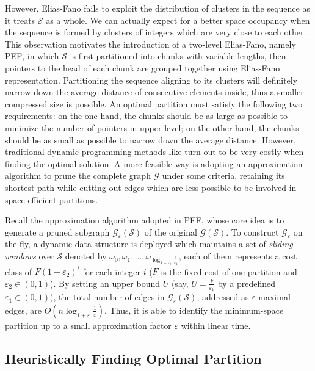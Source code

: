 \documentclass[runningheads,a4paper]{llncs}
\begin{document}
However, Elias-Fano fails to exploit the distribution of clusters in the sequence as it treats $ \mathcal{S} $ as a whole.
We can actually expect for a better space occupancy when the sequence is formed by clusters of integers which are very close to each other.
This observation motivates the introduction of a two-level Elias-Fano, namely PEF, in which $ \mathcal{S} $ is first partitioned into chunks with variable lengths, then pointers to the head of each chunk are grouped together using Elias-Fano representation.
Partitioning the sequence aligning to its clusters will definitely narrow down the average distance of consecutive elements inside, thus a smaller compressed size is possible.
An optimal partition must satisfy the following two requirements: on the one hand, the chunks should be as large as possible to minimize the number of pointers in upper level; on the other hand, the chunks should be as small as possible to narrow down the average distance.
However, traditional dynamic programming methods like \cite{silvestri2010vsencoding} turn out to be very costly when finding the optimal solution.
A more feasible way is adopting an approximation algorithm to prune the complete graph $ \mathcal{G} $ under some criteria, retaining its shortest path while cutting out edges which are less possible to be involved in space-efficient partitions.

Recall the approximation algorithm adopted in PEF, whose core idea is to generate a pruned subgraph $\mathcal{G}_{\varepsilon}\left(\mathcal{S}\right)$ of the original $\mathcal{G}\left(\mathcal{S}\right)$.
To construct $\mathcal{G}_{\varepsilon}$ on the fly, a dynamic data structure is deployed which maintains a set of \textit{sliding windows} over $\mathcal{S}$ denoted by $\omega_{0},\omega_{1},\dots, \omega_{\log_{1+\varepsilon_2}\frac{1}{\varepsilon_1}}$, each of them represents a cost class of $F\left(1+\varepsilon_2\right)^{i}$ for each integer $i$ ($F$ is the fixed cost of one partition and $\varepsilon_{2}\in\left( 0, 1 \right)$).
By setting an upper bound $U$ (say, $U=\frac{F}{\varepsilon_{1}}$ by a predefined $\varepsilon_{1}\in\left(0, 1\right)$), the total number of edges in $\mathcal{G}_{\varepsilon}\left(\mathcal{S}\right)$, addressed as $\varepsilon$-maximal edges, are $O\left(n\log_{1+\varepsilon}\frac{1}{\varepsilon}\right)$.
Thus, it is able to identify the minimum-space partition up to a small approximation factor $ \varepsilon $ within linear time.

\subsection{Heuristically Finding Optimal Partition}
\end{document}
